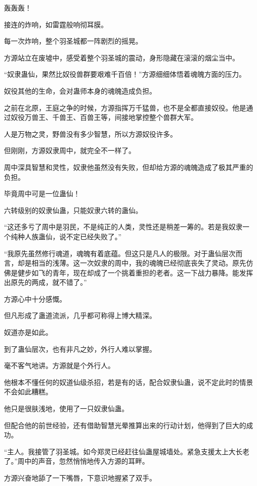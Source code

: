 
\begin{this_body}

轰轰轰！

接连的炸响，如雷霆般响彻耳膜。

每一次炸响，整个羽圣城都一阵剧烈的摇晃。

方源站立在废墟中，感受着整个羽圣城的震动，身形隐藏在滚滚的烟尘当中。

“奴隶蛊仙，果然比奴役兽群要艰难千百倍！”方源细细体悟着魂魄方面的压力。

奴役其他的生命，会对蛊师本身的魂魄造成负担。

之前在北原，王庭之争的时候，方源指挥万千猛兽，也不是全都直接奴役。他是通过奴役万兽王、千兽王、百兽王等，间接地掌控整个兽群大军。

人是万物之灵，野兽没有多少智慧，所以方源奴役许多。

但刚刚，方源奴隶周中，就完全不一样了。

周中深具智慧和灵性，奴隶他虽然没有失败，但却给方源的魂魄造成了极其严重的负担。

毕竟周中可是一位蛊仙！

六转级别的奴隶仙蛊，只能奴隶六转的蛊仙。

“这还多亏了周中是羽民，不是纯正的人类，灵性还是稍差一筹的。若是我奴隶一个纯种人族蛊仙，说不定已经失败了。”

“我原先虽然修行魂道，魂魄有着底蕴。但这只是凡人的极限。对于蛊仙层次而言，却是相当的浅薄。这一次奴隶的周中，我的魂魄已经彻底丧失了灵动。原先仿佛是健步如飞的青年，现在却成了一个挑着重担的老者。这一下战力暴降。能发挥出原先的两成，就不错了。”

方源心中十分感慨。

但凡形成了蛊道流派，几乎都可称得上博大精深。

奴道亦是如此。

到了蛊仙层次，也有非凡之妙，外行人难以掌握。

毫不客气地讲。方源就是个外行人。

他根本不懂任何的奴道仙级杀招，若是有的话，配合奴隶仙蛊，说不定此时的情景不会如此糟糕。

他只是很肤浅地，使用了一只奴隶仙蛊。

但配合他的前世经验，还有借助智慧光晕推算出来的行动计划，他得到了巨大的成功。

“主人。我接管了羽圣城。如今郑灵已经赶往仙蛊屋城墙处。紧急支援太上大长老了。”周中的声音，忽然悄悄地传入方源的耳畔。

方源兴奋地舔了一下嘴唇，下意识地握紧了双手。


\end{this_body}

